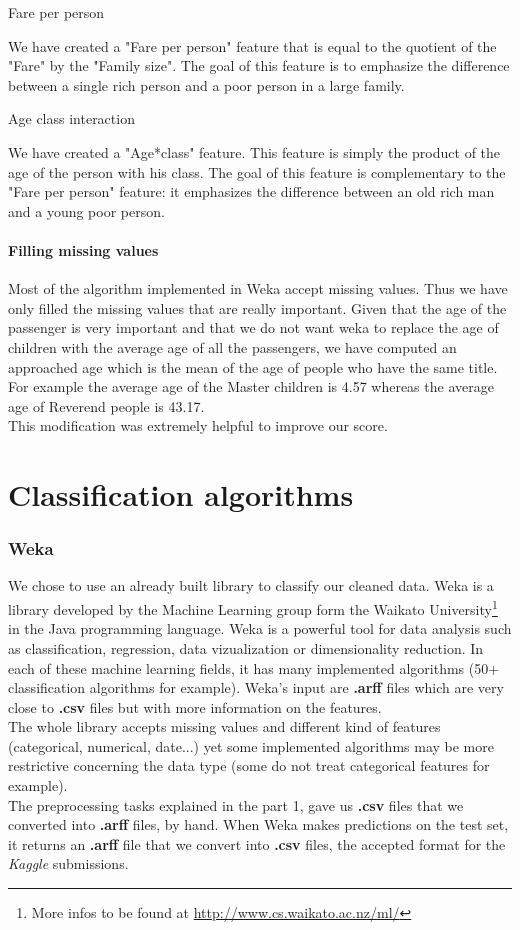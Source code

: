 \documentclass[11pt,a4paper,portrait]{article}
\begin{document}
\subparagraph{Fare per person}
We have created a "Fare per person" feature that is equal to the quotient of the "Fare" by the "Family size". The goal of this feature is to emphasize the difference between a single rich person and a poor person in a large family.

\subparagraph{Age class interaction}
We have created a "Age*class" feature. This feature is simply the product of the age of the person with his class. The goal of this feature is complementary to the "Fare per person" feature: it emphasizes the difference between an old rich man and a young poor person.


\subsection{Filling missing values}
Most of the algorithm implemented in Weka accept missing values. Thus we have only filled the missing values that are really important. Given that the age of the passenger is very important and that we do not want weka to replace the age of children with the average age of all the passengers, we have computed an approached age which is the mean of the age of people who have the same title. For example the average age of the Master children is 4.57 whereas the average age of Reverend people is 43.17.\\
This modification was extremely helpful to improve our score.


\part{Classification algorithms}
\setcounter{section}{0}

\section{Weka}
We chose to use an already built library to classify our cleaned data. Weka is a library developed by the Machine Learning group form the Waikato University\footnote{More infos to be found at \url{http://www.cs.waikato.ac.nz/ml/}} in the Java programming language. Weka is a powerful tool for data analysis such as classification, regression, data vizualization or dimensionality reduction. In each of these machine learning fields, it has many implemented algorithms (50+ classification algorithms for example). Weka's input are \textbf{.arff} files which are very close to \textbf{.csv} files but with more information on the features.\\
The whole library accepts missing values and different kind of features (categorical, numerical, date...) yet some implemented algorithms may be more restrictive concerning the data type (some do not treat categorical features for example).\\
The preprocessing tasks explained in the part 1, gave us \textbf{.csv} files that we converted into \textbf{.arff} files, by hand. When Weka makes predictions on the test set, it returns an \textbf{.arff} file that we convert into \textbf{.csv} files, the accepted format for the \textit{Kaggle} submissions.
\end{document}
